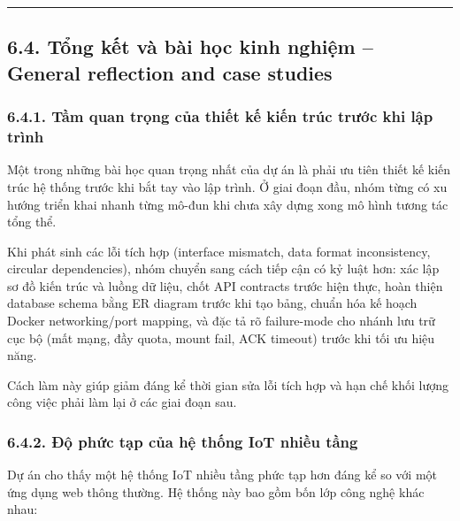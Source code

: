 \documentclass[13pt,a4paper]{extarticle}
\renewcommand{\\}{\thesislongtableorignewline\hline}%
\begin{document}
\begin{center}\rule{0.5\linewidth}{0.5pt}\end{center}

\subsection{6.4. Tổng kết và bài học kinh nghiệm -- General reflection and case studies}\label{64-tux1ed5ng-kux1ebft-vuxe0-buxe0i-hux1ecdc-kinh-nghiux1ec7m--general-reflection-and-case-studies}

\subsubsection{6.4.1. Tầm quan trọng của thiết kế kiến trúc trước khi
lập
trình}\label{641-tux1ea7m-quan-trux1ecdng-cux1ee7a-thiux1ebft-kux1ebf-kiux1ebfn-truxfac-trux1b0ux1edbc-khi-lux1eadp-truxecnh}

Một trong những bài học quan trọng nhất của dự án là phải ưu tiên thiết
kế kiến trúc hệ thống trước khi bắt tay vào lập trình. Ở giai đoạn đầu,
nhóm từng có xu hướng triển khai nhanh từng mô-đun khi chưa xây dựng
xong mô hình tương tác tổng thể.

Khi phát sinh các lỗi tích hợp (interface mismatch, data format
inconsistency, circular dependencies), nhóm chuyển sang cách tiếp cận có
kỷ luật hơn: xác lập sơ đồ kiến trúc và luồng dữ liệu, chốt API
contracts trước hiện thực, hoàn thiện database schema bằng ER diagram
trước khi tạo bảng, chuẩn hóa kế hoạch Docker networking/port mapping,
và đặc tả rõ failure-mode cho nhánh lưu trữ cục bộ (mất mạng, đầy quota,
mount fail, ACK timeout) trước khi tối ưu hiệu năng.

Cách làm này giúp giảm đáng kể thời gian sửa lỗi tích hợp và hạn chế
khối lượng công việc phải làm lại ở các giai đoạn sau.

\subsubsection{6.4.2. Độ phức tạp của hệ thống IoT nhiều
tầng}\label{642-ux111ux1ed9-phux1ee9c-tux1ea1p-cux1ee7a-hux1ec7-thux1ed1ng-iot-nhiux1ec1u-tux1ea7ng}

Dự án cho thấy một hệ thống IoT nhiều tầng phức tạp hơn đáng kể so với
một ứng dụng web thông thường. Hệ thống này bao gồm bốn lớp công nghệ
khác nhau:
\end{document}
